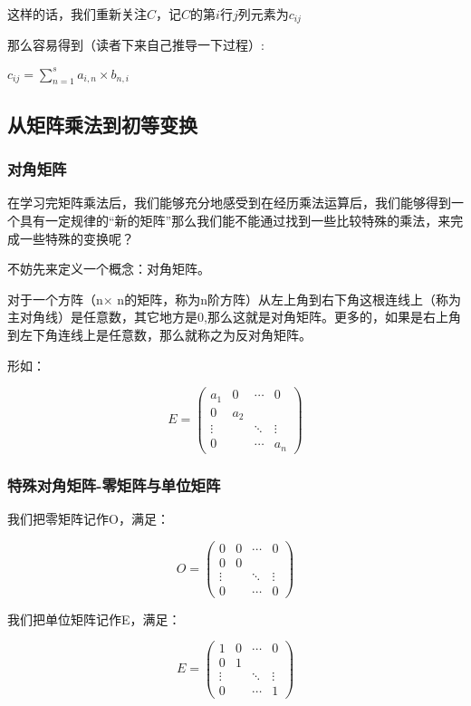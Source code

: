 \documentclass[12.8pt,a4paper,numbering = AMSalpha]{book}
\begin{document}
$这样的话，我们重新关注C，记C的第i行j列元素为c_{ij}$

那么容易得到（读者下来自己推导一下过程）:

\begin{center}
	$c_{ij}=\sum\limits_{n = 1}^{s}{a_{i,n} \times b_{n,i}}$
\end{center}

\subsection{从矩阵乘法到初等变换}

\subsubsection{对角矩阵}
在学习完矩阵乘法后，我们能够充分地感受到在经历乘法运算后，我们能够得到一个具有一定规律的“新的矩阵”那么我们能不能通过找到一些比较特殊的乘法，来完成一些特殊的变换呢？

不妨先来定义一个概念：对角矩阵。

对于一个方阵（n$\times$ n的矩阵，称为n阶方阵）从左上角到右下角这根连线上（称为主对角线）是任意数，其它地方是0,那么这就是对角矩阵。更多的，如果是右上角到左下角连线上是任意数，那么就称之为反对角矩阵。

形如：

\[
E=
\begin{pmatrix}
	a_1&0&\cdots&0\\
	0&a_2&&\\
	\vdots&&\ddots&\vdots\\
	0&&\cdots&a_n
\end{pmatrix}
\]

\subsubsection{特殊对角矩阵-零矩阵与单位矩阵}

我们把零矩阵记作O，满足：

\[
O=
\begin{pmatrix}
	0&0&\cdots&0\\
	0&0&&\\
	\vdots&&\ddots&\vdots\\
	0&&\cdots&0
\end{pmatrix}
\]

我们把单位矩阵记作E，满足：

\[
E=
\begin{pmatrix}
	1&0&\cdots&0\\
	0&1&&\\
	\vdots&&\ddots&\vdots\\
	0&&\cdots&1
\end{pmatrix}
\]
\end{document}
